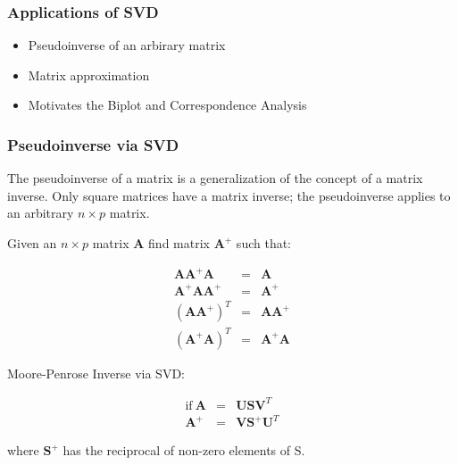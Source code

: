 \documentclass{beamer}
\newcommand{\Mtx}[1]{\ensuremath{\mathbf{#1}}}
\newcommand{\PsInv}[1]{\ensuremath{\mathbf{#1}^{+}}}
\begin{document}


\begin{frame}
  \frametitle{Applications of SVD}

\begin{itemize}
\item Pseudoinverse of an arbirary matrix
\item Matrix approximation
\item Motivates the Biplot and Correspondence Analysis
\end{itemize}

\end{frame}


\begin{frame}
  \frametitle{Pseudoinverse via SVD}

The pseudoinverse of a matrix is a generalization of the concept of a matrix inverse. Only square matrices have a matrix inverse; the pseudoinverse applies to an arbitrary $n \times p$ matrix.

\smallskip
Given an $n \times p$ matrix $\Mtx{A}$ find matrix $\PsInv{A}$ such that:

\begin{eqnarray*}
\Mtx{A} \PsInv{A} \Mtx{A} & = & \Mtx{A} \\
\PsInv{A} \Mtx{A} \PsInv{A} & = & \PsInv{A}\\
(\Mtx{A} \PsInv{A})^T & = & \Mtx{A} \PsInv{A}\\
(\PsInv{A} \Mtx{A})^T & = & \PsInv{A} \Mtx{A}
\end{eqnarray*}

\smallskip
Moore-Penrose Inverse via SVD:

\begin{eqnarray*}
\text{if}\ \Mtx{A} &=& \Mtx{U}\Mtx{S}\Mtx{V}^T \\
\PsInv{A} &=& \Mtx{V} \PsInv{S}  \Mtx{U}^T
\end{eqnarray*}

where \PsInv{S} has the reciprocal of non-zero elements of S.

\end{frame}
\end{document}
